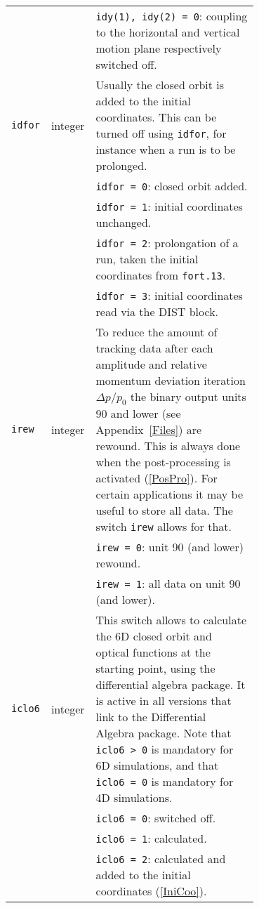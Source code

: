 \begin{longtabu}{@{}llp{0.7\linewidth}}
                           &          & \texttt{idy(1), idy(2) = 0}: coupling to the horizontal and vertical motion plane respectively switched off. \\
    \texttt{idfor}         & integer  & Usually the closed orbit is added to the initial coordinates. This can be turned off using \texttt{idfor}, for instance when a run is to be prolonged. \\
                           &          & \texttt{idfor = 0}: closed orbit added. \\
                           &          & \texttt{idfor = 1}: initial coordinates unchanged. \\
                           &          & \texttt{idfor = 2}: prolongation of a run, taken the initial coordinates from \texttt{fort.13}. \\
                           &          & \texttt{idfor = 3}: initial coordinates read via the DIST block. \\
    \texttt{irew}          & integer  & To reduce the amount of tracking data after each amplitude and relative momentum deviation iteration $\Delta p/p_0$ the binary output units 90 and lower (see Appendix~\ref{Files}) are rewound. This is always done when the post-processing is activated (\ref{PosPro}). For certain applications it may be useful to store all data. The switch \texttt{irew} allows for that. \\
                           &          & \texttt{irew = 0}: unit 90 (and lower) rewound. \\
                           &          & \texttt{irew = 1}: all data on unit 90 (and lower). \\
    \texttt{iclo6}         & integer  & This switch allows to calculate the 6D closed orbit and optical functions at the starting point, using the differential algebra package. It is active in all versions that link to the Differential Algebra package.  Note that \texttt{iclo6 > 0} is mandatory for 6D simulations, and that \texttt{iclo6 = 0} is mandatory for 4D simulations. \\
                           &          & \texttt{iclo6 = 0}: switched off. \\
                           &          & \texttt{iclo6 = 1}: calculated. \\
                           &          & \texttt{iclo6 = 2}: calculated and added to the initial coordinates (\ref{IniCoo}). \\

\end{longtabu}
